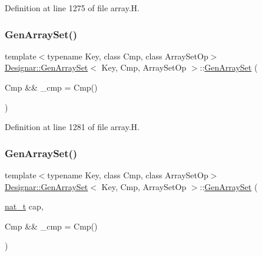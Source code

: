 Definition at line 1275 of file array.\+H.

\mbox{\label{class_designar_1_1_gen_array_set_a6dd76e1d1ccb49b3e984c18b05c98dd2}} 
\subsubsection{\texorpdfstring{Gen\+Array\+Set()}{GenArraySet()}\hspace{0.1cm}{\footnotesize\ttfamily [2/6]}}
{\footnotesize\ttfamily template$<$typename Key, class Cmp, class Array\+Set\+Op$>$ \\
\hyperlink{class_designar_1_1_gen_array_set}{Designar\+::\+Gen\+Array\+Set}$<$ Key, Cmp, Array\+Set\+Op $>$\+::\hyperlink{class_designar_1_1_gen_array_set}{Gen\+Array\+Set} (\begin{DoxyParamCaption}\item[{Cmp \&\&}]{\+\_\+cmp = {\ttfamily Cmp()} }\end{DoxyParamCaption})\hspace{0.3cm}{\ttfamily [inline]}}



Definition at line 1281 of file array.\+H.

\mbox{\label{class_designar_1_1_gen_array_set_ab2ffd26edcd909f936394e538b43d2c4}} 
\subsubsection{\texorpdfstring{Gen\+Array\+Set()}{GenArraySet()}\hspace{0.1cm}{\footnotesize\ttfamily [3/6]}}
{\footnotesize\ttfamily template$<$typename Key, class Cmp, class Array\+Set\+Op$>$ \\
\hyperlink{class_designar_1_1_gen_array_set}{Designar\+::\+Gen\+Array\+Set}$<$ Key, Cmp, Array\+Set\+Op $>$\+::\hyperlink{class_designar_1_1_gen_array_set}{Gen\+Array\+Set} (\begin{DoxyParamCaption}\item[{\hyperlink{namespace_designar_aa72662848b9f4815e7bf31a7cf3e33d1}{nat\+\_\+t}}]{cap,  }\item[{Cmp \&\&}]{\+\_\+cmp = {\ttfamily Cmp()} }\end{DoxyParamCaption})\hspace{0.3cm}{\ttfamily [inline]}}



